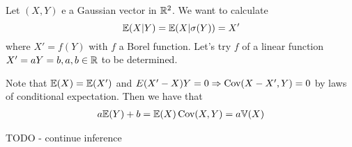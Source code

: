 \begin{exmp}
  \label{defn:inequalities:7}
  Let $(X, Y)$ e a Gaussian vector in $\mathbb{R}^{2}$.  We want to calculate
  \begin{equation}
    \label{eq:21}
    \E{X | Y} = \E{X | \sigma(Y) } = X'
  \end{equation} where $X' = f(Y)$ with $f$ a Borel function.  Let's
  try $f$ of a linear function $X' = aY = b, a, b \in \mathbb{R}$ to be
  determined.

  Note that $\E{X} = \E{X'}$ and $E{(X' - X) Y} = 0 \Rightarrow
  \Cov{X-X'}{Y} = 0$ by laws of
  conditional expectation.  Then we have that
  \begin{align}
    \label{eq:22}
    a\E{Y} + b = \E{X}
    \Cov{X}{Y} = a \Var{X}
  \end{align}

  TODO - continue inference
\end{exmp}

